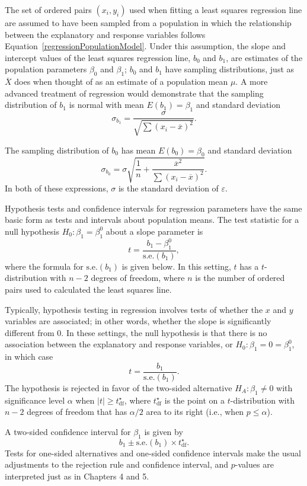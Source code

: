 The set of ordered pairs $(x_i,y_i)$ used when fitting a least squares regression line are assumed to have been sampled from a population in which the relationship between the explanatory and response variables follows Equation~\ref{regressionPopulationModel}. Under this assumption, the slope and intercept values of the least squares regression line, $b_0$ and $b_1$, are estimates of the population parameters $\beta_0$ and $\beta_1$; $b_0$ and $b_1$ have sampling distributions, just as $\overline{X}$ does when thought of as an estimate of a population mean $\mu$. A more advanced treatment of regression would demonstrate that the sampling distribution of $b_1$ is normal with mean $E(b_1) = \beta_1$ and standard deviation
\[\sigma_{b_1} = \frac{\sigma}{\sqrt{\sum(x_i -\overline{x})^2}}.\]

The sampling distribution of $b_0$ has mean $E(b_0) = \beta_0$ and standard deviation 
\[\sigma_{b_0} = \sigma \sqrt{\frac{1}{n} + \frac{\overline{x}^2}{\sum(x_i - \overline{x})^2}}.\]
In both of these expressions, $\sigma$ is the standard deviation of $\varepsilon$.

Hypothesis tests and confidence intervals for regression parameters have the same basic form as tests and intervals about population means. The test statistic for a null hypothesis $H_0: \beta_1 = \beta^0_1$ about a slope parameter is
\[t = \frac{b_1 - \beta^0_1}{\text{s.e.}(b_1)},\]
where the formula for $\text{s.e.}(b_1)$ is given below.
In this setting, $t$ has a $t$-distribution with $n - 2$ degrees of freedom, where $n$ is the number of ordered pairs used to calculated the least squares line.  

Typically, hypothesis testing in regression involves tests of whether the $x$ and $y$ variables are associated; in other words, whether the slope is significantly different from 0. In these settings, the null hypothesis is that there is no association between the explanatory and response variables, or $H_0: \beta_1 = 0 = \beta^0_1$, in which case
\[t = \frac{b_1}{\text{s.e.}(b_1)}.\]
The hypothesis is rejected in favor of the two-sided alternative $H_A: \beta_1 \neq 0$ with significance level $\alpha$ when $|t| \ge t^\star_{\text{df}}$, where $t^\star_{\text{df}}$ is the point on a $t$-distribution with $n-2$ degrees of freedom that has $\alpha/2$ area to its right (i.e., when $p \leq \alpha$).

A two-sided confidence interval for $\beta_1$ is given by 
\[b_1 \pm \text{s.e.}(b_1) \times t^\star_{\text{df}}.\]
Tests for one-sided alternatives and one-sided confidence intervals make the usual adjustments to the rejection rule and confidence interval, and $p$-values are interpreted just as in Chapters 4 and 5.

